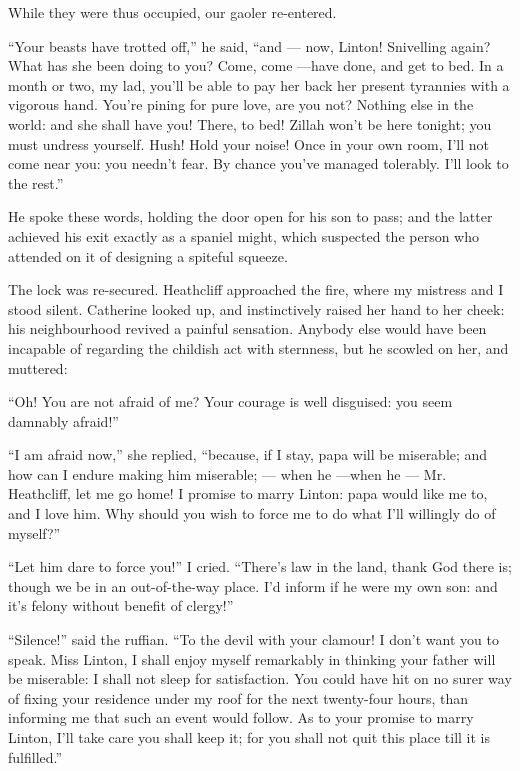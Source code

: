 \par While they were thus occupied, our gaoler re-entered.
\par “Your beasts have trotted off,” he said, “and — now, Linton! Snivelling again? What has she been doing to you? Come, come —have done, and get to bed. In a month or two, my lad, you'll be able to pay her back her present tyrannies with a vigorous hand. You're pining for pure love, are you not? Nothing else in the world: and she shall have you! There, to bed! Zillah won't be here tonight; you must undress yourself. Hush! Hold your noise! Once in your own room, I'll not come near you: you needn't fear. By chance you've managed tolerably. I'll look to the rest.”
\par He spoke these words, holding the door open for his son to pass; and the latter achieved his exit exactly as a spaniel might, which suspected the person who attended on it of designing a spiteful squeeze.
\par The lock was re-secured. Heathcliff approached the fire, where my mistress and I stood silent. Catherine looked up, and instinctively raised her hand to her cheek: his neighbourhood revived a painful sensation. Anybody else would have been incapable of regarding the childish act with sternness, but he scowled on her, and muttered:
\par “Oh! You are not afraid of me? Your courage is well disguised: you seem damnably afraid!”
\par “I am afraid now,” she replied, “because, if I stay, papa will be miserable; and how can I endure making him miserable; — when he —when he — Mr. Heathcliff, let me go home! I promise to marry Linton: papa would like me to, and I love him. Why should you wish to force me to do what I'll willingly do of myself?”
\par “Let him dare to force you!” I cried. “There's law in the land, thank God there is; though we be in an out-of-the-way place. I'd inform if he were my own son: and it's felony without benefit of clergy!”
\par “Silence!” said the ruffian. “To the devil with your clamour! I don't want you to speak. Miss Linton, I shall enjoy myself remarkably in thinking your father will be miserable: I shall not sleep for satisfaction. You could have hit on no surer way of fixing your residence under my roof for the next twenty-four hours, than informing me that such an event would follow. As to your promise to marry Linton, I'll take care you shall keep it; for you shall not quit this place till it is fulfilled.”
